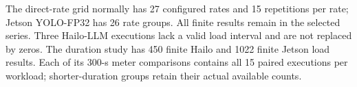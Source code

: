The direct-rate grid normally has 27 configured rates and 15 repetitions per rate; Jetson YOLO-FP32 has 26 rate groups. All finite results remain in the selected series. Three Hailo-LLM executions lack a valid load interval and are not replaced by zeros. The duration study has 450 finite Hailo and 1022 finite Jetson load results. Each of its 300-s meter comparisons contains all 15 paired executions per workload; shorter-duration groups retain their actual available counts.
